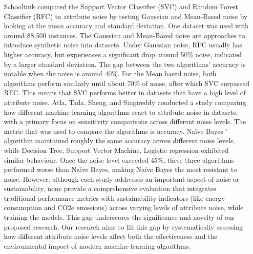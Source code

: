 \documentclass[conference]{IEEEtran}
\begin{document}
\newline
\newline 
Schooltink \cite{schooltink} compared the Support Vector Classifier (SVC) and Random Forest Classifier (RFC) to attribute noise by testing Gaussian and Mean-Based noise by looking at the mean accuracy and standard deviation. One dataset was used with around 88,500 instances. The Gaussian and Mean-Based noise are approaches to introduce synthetic noise into datasets. Under Gaussian noise, RFC usually has higher accuracy, but experiences a significant drop around 50\% noise, indicated by a larger standard deviation. The gap between the two algorithms' accuracy is notable when the noise is around 40\%. For the Mean based noise, both algorithms perform similarly until about 70\% of noise, after which SVC surpassed RFC. This means that SVC performs better in datasets that have a high level of attribute noise. 
\newline
\newline
Atla, Tada, Sheng, and Singireddy \cite{atla2011} conducted a study comparing how different machine learning algorithms react to attribute noise in datasets, with a primary focus on sensitivity comparisons across different noise levels. The metric that was used to compare the algorithms is accuracy. Naïve Bayes ' algorithm maintained roughly the same accuracy across different noise levels, while Decision Tree, Support Vector Machine, Logistic regression exhibited similar behaviour. Once the noise level exceeded 45\%, these three algorithms performed worse than Naïve Bayes, making Naïve Bayes the most resistant to noise.
\newline
\newline
However, although each study addresses an important aspect of noise or sustainability, none provide a comprehensive evaluation that integrates traditional performance metrics with sustainability indicators (like energy consumption and CO2e emissions) across varying levels of attribute noise, while training the models. This gap underscores the significance and novelty of our proposed research. Our research aims to fill this gap by systematically assessing how different attribute noise levels affect both the effectiveness and the environmental impact of modern machine learning algorithms.
\end{document}
